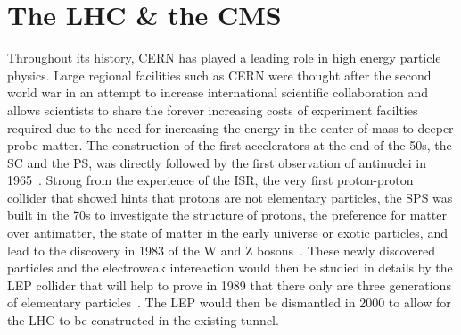 	

\section{The \acl{LHC} \& the \acl{CMS}}
\label{chapt2:sec:LHC-CMS}

	Throughout its history, CERN has played a leading role in high energy particle physics. Large regional facilities such as CERN were thought after the second world war in an attempt to increase international scientific collaboration and allows scientists to share the forever increasing costs of experiment facilties required due to the need for increasing the energy in the center of mass to deeper probe matter. The construction of the first accelerators at the end of the 50s, the \acf{SC} and the \acf{PS}, was directly followed by the first observation of antinuclei in 1965~\cite{MASSAM1965}. Strong from the experience of the \acf{ISR}, the very first proton-proton collider that showed hints that protons are not elementary particles, the \acf{SPS} was built in the 70s to investigate the structure of protons, the preference for matter over antimatter, the state of matter in the early universe or exotic particles, and lead to the discovery in 1983 of the W and Z bosons~\cite{UA1W1983,UA2W1983,UA1Z1983,UA2Z1983}. These newly discovered particles and the electroweak intereaction would then be studied in details by the \acf{LEP} collider that will help to prove in 1989 that there only are three generations of elementary particles~\cite{ALEPH1989}. The LEP would then be dismantled in 2000 to allow for the LHC to be constructed in the existing tunnel.

